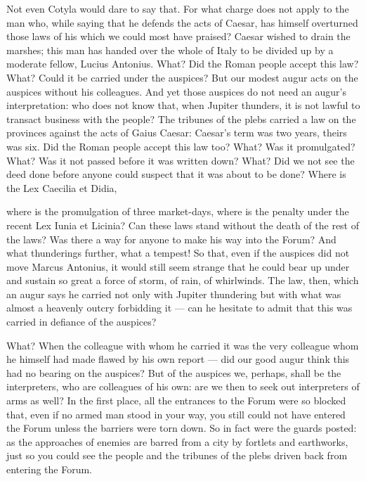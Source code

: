  Not even Cotyla would dare to say that. For what charge does not apply to the man who, while saying that he defends the acts of Caesar, has himself overturned those laws of his which we could most have praised? Caesar wished to drain the marshes; this man has handed over the whole of Italy to be divided up by a moderate fellow, Lucius Antonius. What? Did the Roman people accept this law? What? Could it be carried under the auspices? But our modest augur acts on the auspices without his colleagues. And yet those auspices do not need an augur's interpretation: who does not know that, when Jupiter thunders, it is not lawful to transact business with the people? The tribunes of the plebs carried a law on the provinces against the acts of Gaius Caesar: Caesar's term was two years, theirs was six. Did the Roman people accept this law too? What? Was it promulgated? What? Was it not passed before it was written down? What? Did we not see the deed done before anyone could suspect that it was about to be done? Where is the Lex Caecilia et Didia,

 where is the promulgation of three market-days, where is the penalty under the recent Lex Iunia et Licinia? Can these laws stand without the death of the rest of the laws? Was there a way for anyone to make his way into the Forum? And what thunderings further, what a tempest! So that, even if the auspices did not move Marcus Antonius, it would still seem strange that he could bear up under and sustain so great a force of storm, of rain, of whirlwinds. The law, then, which an augur says he carried not only with Jupiter thundering but with what was almost a heavenly outcry forbidding it --- can he hesitate to admit that this was carried in defiance of the auspices?

 What? When the colleague with whom he carried it was the very colleague whom he himself had made flawed by his own report --- did our good augur think this had no bearing on the auspices? But of the auspices we, perhaps, shall be the interpreters, who are colleagues of his own: are we then to seek out interpreters of arms as well? In the first place, all the entrances to the Forum were so blocked that, even if no armed man stood in your way, you still could not have entered the Forum unless the barriers were torn down. So in fact were the guards posted: as the approaches of enemies are barred from a city by fortlets and earthworks, just so you could see the people and the tribunes of the plebs driven back from entering the Forum.

